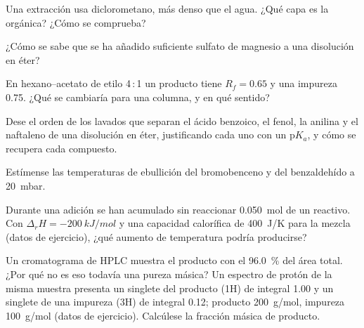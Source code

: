 \begin{exercise}[$\star$]\label{exo:b2:lab-techniques-2:2}
Una extracción usa diclorometano, más denso que el agua. ¿Qué capa es la orgánica? ¿Cómo se comprueba?
\end{exercise}

\begin{exercise}[$\star$]\label{exo:b2:lab-techniques-2:3}
¿Cómo se sabe que se ha añadido suficiente sulfato de magnesio a una disolución en éter?
\end{exercise}

\begin{exercise}[$\star$]\label{exo:b2:lab-techniques-2:4}
En hexano--acetato de etilo 4\,:\,1 un producto tiene $R_f = 0.65$ y una impureza 0.75. ¿Qué se cambiaría
para una columna, y en qué sentido?
\end{exercise}

\begin{exercise}[$\star\star$]\label{exo:b2:lab-techniques-2:5}
Dese el orden de los lavados que separan el ácido benzoico, el fenol, la anilina y el naftaleno de una disolución
en éter, justificando cada uno con un $\mathrm pK_a$, y cómo se recupera cada compuesto.
\end{exercise}

\begin{exercise}[$\star\star$]\label{exo:b2:lab-techniques-2:6}
Estímense las temperaturas de ebullición del bromobenceno y del benzaldehído a \qty{20}{mbar}.
\end{exercise}

\begin{exercise}[$\star\star$]\label{exo:b2:lab-techniques-2:7}
Durante una adición se han acumulado sin reaccionar \qty{0.050}{mol} de un reactivo. Con $\Delta_rH =
\qty{-200}{kJ/mol}$ y una capacidad calorífica de \qty{400}{J/K} para la mezcla (datos de ejercicio), ¿qué
aumento de temperatura podría producirse?
\end{exercise}

\begin{exercise}[$\star\star$]\label{exo:b2:lab-techniques-2:8}
Un cromatograma de HPLC muestra el producto con el 96.0~\% del área total. ¿Por qué no es eso todavía una pureza másica? Un
espectro de protón de la misma muestra presenta un singlete del producto (1H) de integral 1.00 y un singlete de una impureza
(3H) de integral 0.12; producto \qty{200}{g/mol}, impureza \qty{100}{g/mol} (datos de ejercicio). Calcúlese la
fracción másica de producto.
\end{exercise}

